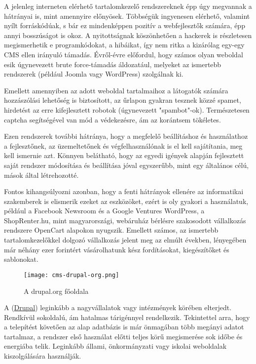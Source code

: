 \label{Chap:tema}

A jelenleg interneten elérhető tartalomkezelő rendszereknek épp úgy megvannak a hátrányai is, mint amennyire előnyösek. Többségük ingyenesen elérhető, valamint nyílt forráskódúak, s bár ez mindenképpen pozitív a webfejlesztők számára, épp annyi bosszúságot is okoz. A nyitottságnak köszönhetően a hackerek is részletesen megismerhetik e programkódokat, a hibáikat, így nem ritka a kizárólag egy-egy CMS ellen irányuló támadás. Évről-évre előfordul, hogy számos olyan weboldal esik úgynevezett brute force-támadás áldozatául, melyeket az ismertebb rendszerek (például Joomla vagy WordPress) szolgálnak ki.

Emellett amennyiben az adott weboldal tartalmaihoz a látogatók számára hozzászólási lehetőség is biztosított, az űrlapon gyakran tesznek közzé spamet, hirdetést az erre kifejlesztett robotok (úgynevezett "spambot"-ok). Természetesen captcha segítségével van mód a védekezésre, ám az korántsem tökéletes.

Ezen rendszerek további hátránya, hogy a megfelelő beállításhoz és használathoz a fejlesztőnek, az üzemeltetőnek és végfelhasználónak is el kell sajátítania, meg kell ismernie azt. Könnyen belátható, hogy az egyedi igények alapján fejlesztett saját rendszer módosítása és beállítása jóval egyszerűbb, mint egy általános célú, mások által létrehozotté.

Fontos kihangsúlyozni azonban, hogy a fenti hátrányok ellenére az informatikai szakemberek is elismerik ezeket az eszközöket, ezért is oly gyakori a használatuk, például a Facebook Newsroom és a Google Ventures WordPress, a ShopRenter.hu, mint magyarországi, webáruház bérlésre szakosodott vállalkozás rendszere OpenCart alapokon nyugszik. Emellett számos, az ismertebb tartalomkezelőkkel dolgozó vállalkozás jelent meg az elmúlt években, lényegében már néhány ezer forintért vásárolhatunk kész fordításokat, kiegészítőket és sablonokat.

\newpage


\begin{figure}
	\texttt{[image: cms-drupal-org.png]}
	\caption{A drupal.org főoldala}
\end{figure}

A (\href{https://www.drupal.org/}{Drupal}) leginkább a nagyvállalatok vagy intézmények körében elterjedt. Rendkívül sokoldalú, ám hatalmas tárigénnyel rendelkezik. Tekintettel arra, hogy a telepítést követően az alap adatbázis is már önmagában több megányi adatot tartalmaz, a rendszer első használat előtti teljes körű megismerése sok időbe és energiába telik. Leginkább állami, önkormányzati vagy iskolai weboldalak kiszolgálására használják.

